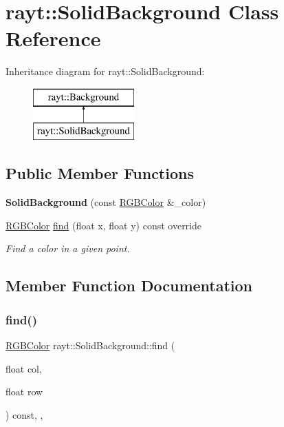 \hypertarget{classrayt_1_1_solid_background}{}\section{rayt\+::Solid\+Background Class Reference}
\label{classrayt_1_1_solid_background}
Inheritance diagram for rayt\+::Solid\+Background\+:\begin{figure}[H]
\begin{center}
\leavevmode
\includegraphics[height=2.000000cm]{classrayt_1_1_solid_background}
\end{center}
\end{figure}
\subsection*{Public Member Functions}
\begin{DoxyCompactItemize}
\item 
\mbox{\label{classrayt_1_1_solid_background_a6f58eb6844bed551dac8a41f3856a78f}} 
{\bfseries Solid\+Background} (const \mbox{\hyperlink{classtao_1_1_col}{R\+G\+B\+Color}} \&\+\_\+color)
\item 
\mbox{\hyperlink{classtao_1_1_col}{R\+G\+B\+Color}} \mbox{\hyperlink{classrayt_1_1_solid_background_a7eb2662ca6636b66da5f11d16f923248}{find}} (float x, float y) const override
\begin{DoxyCompactList}\small\item\em Find a color in a given point. \end{DoxyCompactList}\end{DoxyCompactItemize}


\subsection{Member Function Documentation}
\mbox{\label{classrayt_1_1_solid_background_a7eb2662ca6636b66da5f11d16f923248}} 
\subsubsection{\texorpdfstring{find()}{find()}}
{\footnotesize\ttfamily \mbox{\hyperlink{classtao_1_1_col}{R\+G\+B\+Color}} rayt\+::\+Solid\+Background\+::find (\begin{DoxyParamCaption}\item[{float}]{col,  }\item[{float}]{row }\end{DoxyParamCaption}) const\hspace{0.3cm}{\ttfamily [inline]}, {\ttfamily [override]}, {\ttfamily [virtual]}}




